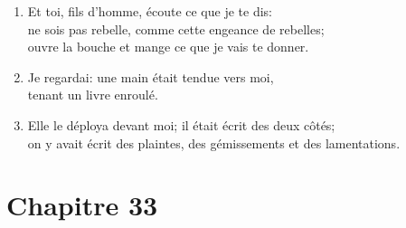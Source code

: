 \begin{enumerate}[leftmargin=\psleftmargin, labelsep = \pslabelsep, label={\arabic*}, font=\color{\pscolor}\small\textsuperscript, parsep=0em, itemsep=0em, topsep=0em ]
      \item Et toi, fils d’homme, écoute ce que je te dis: \\ ne sois pas rebelle, comme cette engeance de rebelles; \\ ouvre la bouche et mange ce que je vais te donner.
      \item Je regardai: une main était tendue vers moi, \\ tenant un livre enroulé.
      \item Elle le déploya devant moi; il était écrit des deux côtés; \\ on y avait écrit des plaintes, des gémissements et des lamentations.
\end{enumerate}
\newpage
\section*{Chapitre 33}
